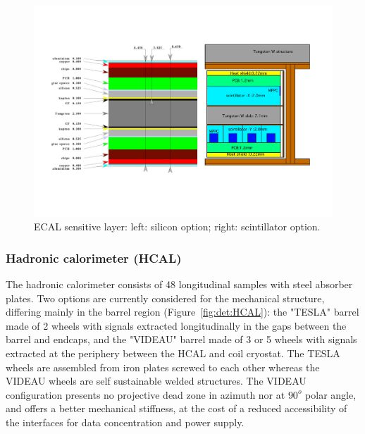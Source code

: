 \begin{figure}[t!]
\centering
\includegraphics[width=0.8\hsize]{Detector/fig/ECAL_readout.pdf}
\caption{ECAL sensitive layer: left: silicon option; right: scintillator option.}
\label{fig:det:ECAL_readout}
\end{figure}


\subsubsection{Hadronic calorimeter (HCAL)}
\label{ild:sec:hcal}

The hadronic calorimeter consists of 48 longitudinal samples with steel absorber plates. Two options are currently considered for the mechanical structure, differing mainly in the barrel region (Figure~\ref{fig:det:HCAL}): the "TESLA" barrel made of 2 wheels with signals extracted longitudinally in the gaps between the barrel and endcaps, and the "VIDEAU" barrel made of 3 or 5 wheels with signals extracted at the periphery between the HCAL and coil cryostat. The TESLA wheels are assembled from iron plates screwed to each other whereas the VIDEAU wheels are self sustainable welded structures. The VIDEAU configuration presents no projective dead zone in azimuth nor at $90^o$ polar angle, and offers a better mechanical stiffness, at the cost of a reduced accessibility of the interfaces for data concentration and power supply.


